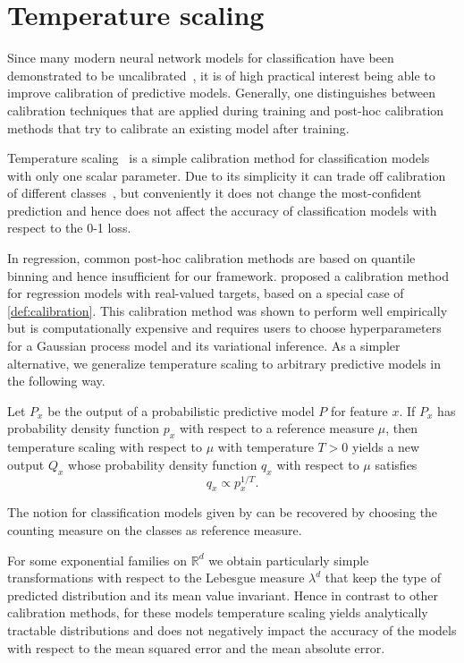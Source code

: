 \documentclass{article}
\begin{document}
\section{Temperature scaling}
\label{app:temperature}

Since many modern neural network models for classification have been
demonstrated to be uncalibrated~\citep{Guo2017}, it is
of high practical interest being able to improve calibration of
predictive models.
Generally, one distinguishes between calibration techniques that are
applied during training and post-hoc calibration methods that try to
calibrate an existing model after training.

Temperature scaling~\citep{Guo2017} is a simple calibration method 
for classification models with only one scalar parameter. Due to its
simplicity it can trade off calibration of different classes~\citep{Kull2019}, but
conveniently it does not change the most-confident prediction and
hence does not affect the accuracy of classification models with
respect to the 0-1 loss.

In regression, common post-hoc calibration methods are
based on quantile binning and hence insufficient for our framework.
\citet{Song2019} proposed a calibration method for regression models
with real-valued targets, based on a special case of \cref{def:calibration}.
This calibration method was shown to perform well empirically but is
computationally expensive and requires users to choose hyperparameters for
a Gaussian process model and its variational inference.
As a simpler alternative, we
generalize temperature scaling to arbitrary predictive models in the
following way.

\begin{definition}\label{def:temperature}
Let $P_x$ be the output of a probabilistic predictive model $P$ 
for feature $x$. If $P_x$ has probability density function $p_x$ with
respect to a reference measure $\mu$, then temperature scaling
with respect to $\mu$ with temperature $T > 0$ yields a new output
$Q_x$ whose probability density function $q_x$ with respect to $\mu$
satisfies
\begin{equation*}
    q_x \propto p_x^{1/T}.
\end{equation*}
\end{definition}

The notion for classification models given by \citet{Guo2017} can be
recovered by choosing the counting measure on the classes as reference
measure.

For some exponential families on $\mathbb{R}^d$ we obtain
particularly simple transformations with respect to the
Lebesgue measure $\lambda^d$ that keep the type of predicted
distribution and its mean value invariant. Hence in contrast
to other calibration methods, for these models temperature
scaling yields analytically tractable distributions and does
not negatively impact the accuracy of the models with
respect to the mean squared error and the mean absolute
error.
\end{document}
